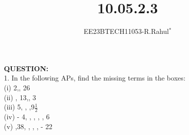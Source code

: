 \documentclass[journal,12pt,twocolumn]{IEEEtran}
\theoremstyle{remark}
\begin{document}

\vspace{3cm}
\title{\textbf{10.05.2.3}}
\author{EE23BTECH11053-R.Rahul$^{*}$%
}

\maketitle
\textbf{QUESTION:}
\\
1. In the following APs, find the missing terms in the boxes:\\
(i) 2,\textunderscore, 26 \\
(ii) \textunderscore, 13,\textunderscore , 3\\
(iii)  5,  \textunderscore, \textunderscore,9\(\frac{1}{2}\) \\
(iv) - 4, \textunderscore,  \textunderscore, \textunderscore, \textunderscore, 6\\
(v)  \textunderscore,38, \textunderscore, \textunderscore, \textunderscore, - 22\\

\solution
\fi

\end{document}
